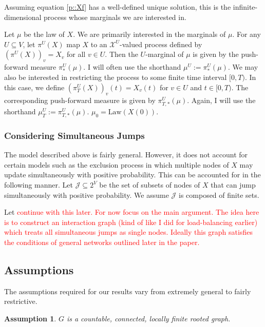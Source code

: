 \documentclass[12pt]{article}
\newcommand{\mc}{\mathcal}
\newcommand{\te}{\text}
\newcommand{\tr}{\textcolor{red}}
\newcommand{\ind}{\hspace{24pt}}
\newcommand{\defeq}{:=}								%
\newcommand{\sta}{\mc{X}}							%
\newcommand{\Xf}{X}									%
\newcommand{\m}{\mu}								%
\newcommand{\proj}{\pi}								%
\newcommand{\vind}[1]{_{#1}}						%
\newcommand{\tme}[1]{(#1)}							%
\newcommand{\vpara}[1]{^{#1}}						%
\newcommand{\tpara}[1]{_{#1}}						%
\newcommand{\psf}{_*}								%
\newcommand{\tparapsf}[1]{_{#1,*}}					%
\newcommand{\Jmps}{\mc{J}}							%
\newcommand{\law}{\te{Law}}							%
\newtheorem{assu}[thms]{Assumption}
\begin{document}
Assuming equation \eqref{p::Xf} has a well-defined unique solution, this is the infinite-dimensional process whose marginals we are interested in.

\ind Let \(\m\) be the law of \(\Xf\). We are primarily interested in the marginals of \(\m\). For any \(U \subseteq V\), let \(\proj\vpara{U}(\Xf)\) map \(\Xf\) to an \(\sta^U\)-valued process defined by \((\proj\vpara{U}(\Xf))\vind{v} = \Xf\vind{v}\) for all \(v\in U\). Then the \(U\)-marginal of \(\m\) is given by the push-forward measure \(\proj\vpara{U}\psf(\m)\). I will often use the shorthand \(\m\vpara{U} \defeq \proj\psf\vpara{U}(\m)\). We may also be interested in restricting the process to some finite time interval \([0,T)\). In this case, we define \((\proj\vpara{U}\tpara{T}(\Xf))\vind{v}\tme{t} = \Xf\vind{v}\tme{t}\) for \(v \in U\) and \(t \in [0,T)\). The corresponding push-forward measure is given by \(\proj\vpara{U}\tparapsf{T}(\m)\). Again, I will use the shorthand \(\m\vpara{U}\tpara{T} \defeq \proj\vpara{U}\tparapsf{T}(\m)\). \(\m\tpara{0} = \law(\Xf\tme{0})\).

\subsubsection{Considering Simultaneous Jumps}
\label{sim::p}

The model described above is fairly general. However, it does not account for certain models such as the exclusion process in which multiple nodes of \(\Xf\) may update simultaneously with positive probability. This can be accounted for in the following manner. Let \(\Jmps \subseteq 2^V\) be the set of subsets of nodes of \(\Xf\) that can jump simultaneously with positive probability. We assume \(\Jmps\) is composed of finite sets. 

Let \tr{continue with this later. For now focus on the main argument. The idea here is to construct an interaction graph (kind of like I did for load-balancing earlier) which treats all simultaneous jumps as single nodes. Ideally this graph satisfies the conditions of general networks outlined later in the paper.}

\subsection{Assumptions}
\label{a::not}

The assumptions required for our results vary from extremely general to fairly restrictive.

\begin{assu}
\(G\) is a countable, connected, locally finite rooted graph.
\label{a::gbasics}
\end{assu}
\end{document}
